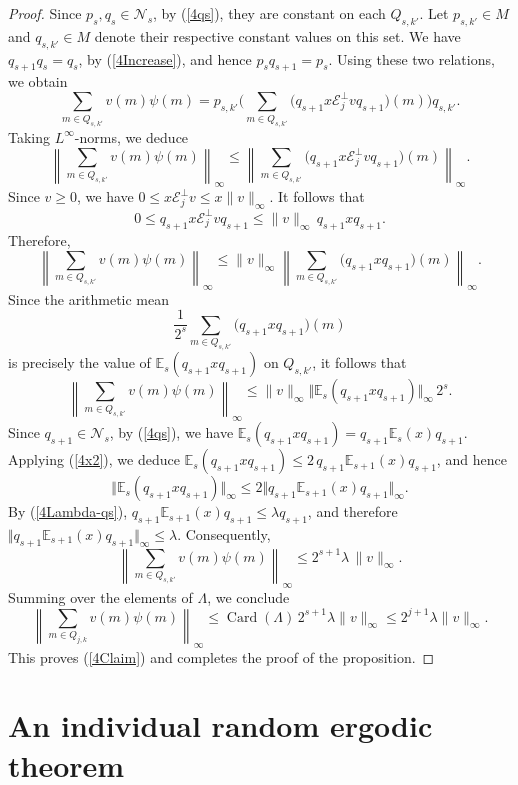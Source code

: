 \documentclass[12pt]{amsart}
\newcommand{\bignorm}[1]{\bigl\Vert#1\bigr\Vert}
\theoremstyle{remark}
\theoremstyle{definition}
\numberwithin{equation}{section}
\begin{document}
\begin{proof}
Since $p_s, q_s \in \mathcal N_s$, by (\ref{4qs}),
they are constant on each $Q_{s,k'}$. Let $p_{s,k'} \in M$ and 
$q_{s,k'} \in M$ denote their respective constant values 
on this set. We have $q_{s+1}q_s=q_s$, by (\ref{4Increase}),
and hence $p_sq_{s+1}=p_s$.
Using these two relations, we obtain
\[
\sum_{m\in Q_{s,k'}} v(m)\psi(m)
=p_{s,k'}\biggl(\sum_{m\in Q_{s,k'}}
\bigl(q_{s+1} x\mathcal{E}_j^\perp v q_{s+1}\bigr)(m)
\biggr) q_{s,k'}.
\]
Taking $L^\infty$-norms, we deduce
\[
\left\| \sum_{m\in Q_{s,k'}} v(m)\psi(m) \right\|_\infty
\le
\left\|
\sum_{m\in Q_{s,k'}}
\bigl(q_{s+1}x\mathcal{E}_j^\perp v q_{s+1}\bigr)(m)
\right\|_\infty.
\]
Since $v\geq 0$, we have 
$0\le x\mathcal{E}_j^\perp v \le x\|v\|_\infty$. 
It follows that
\[
0 \le q_{s+1}x\mathcal{E}_j^\perp v q_{s+1}
\le
\|v\|_\infty\,q_{s+1} x q_{s+1}.
\]
Therefore,
\[
\left\| \sum_{m\in Q_{s,k'}} v(m)\psi(m) \right\|_\infty
\le
\|v\|_\infty
\left\|
\sum_{m\in Q_{s,k'}}
\bigl(q_{s+1} x q_{s+1}\bigr)(m)
\right\|_\infty.
\]
Since the arithmetic mean
$$
\frac{1}{2^s}\sum_{m\in Q_{s,k'}}
\bigl(q_{s+1} x q_{s+1}\bigr)(m)
$$
is precisely the value of
$\mathbb{E}_s(q_{s+1}x q_{s+1})$ on $Q_{s,k'}$, 
it follows that
\[
\left\| \sum_{m\in Q_{s,k'}} v(m)\psi(m) \right\|_\infty
\le
\|v\|_\infty
\bignorm{\mathbb{E}_s(q_{s+1}x q_{s+1})}_\infty
\,2^s.
\]
Since $q_{s+1}\in\mathcal N_s$, by (\ref{4qs}), we have
$\mathbb{E}_s(q_{s+1}x q_{s+1})
=q_{s+1}\mathbb{E}_s(x)q_{s+1}$. Applying (\ref{4x2}), we deduce 
$\mathbb{E}_s(q_{s+1}x q_{s+1})
\le
2\,q_{s+1}\mathbb{E}_{s+1}(x)q_{s+1}$,
and hence
\[
\bignorm{\mathbb{E}_s(q_{s+1}x q_{s+1})}_\infty
\le
2\bignorm{q_{s+1}\mathbb{E}_{s+1}(x)q_{s+1}}_\infty.
\]
By (\ref{4Lambda-qs}), \(q_{s+1}\mathbb{E}_{s+1}(x)q_{s+1}
\le
\lambda q_{s+1}\), and therefore 
\(\bignorm{q_{s+1}\mathbb{E}_{s+1}(x)q_{s+1}}_\infty
\leq
\lambda\). Consequently,
\[
\left\| \sum_{m\in Q_{s,k'}} v(m)
\psi(m) \right\|_\infty
\le
2^{s+1}\lambda\,\|v\|_\infty.
\]
Summing over the elements of $\Lambda$, we conclude
\[
\left\| \sum_{m\in Q_{j,k}} v(m)\psi(m) \right\|_\infty
\le
\operatorname{Card}(\Lambda)\,2^{s+1}\lambda\|v\|_\infty
\le
2^{j+1}\lambda\|v\|_\infty.
\]
This proves (\ref{4Claim}) and completes the proof of the proposition.
\end{proof}
\section{An individual random ergodic theorem}\label{5}
\end{document}
